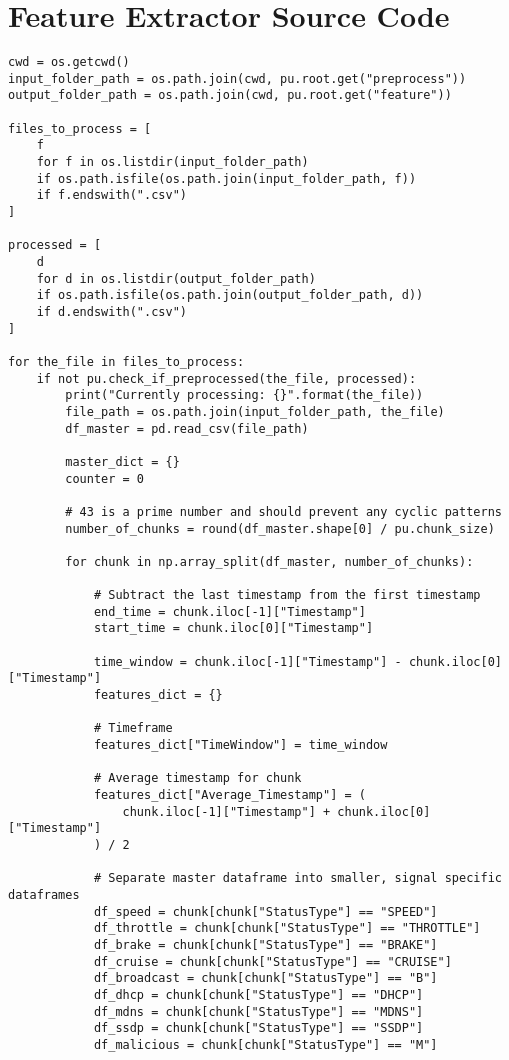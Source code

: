 \section{Feature Extractor Source Code}
\begin{verbatim}
cwd = os.getcwd()
input_folder_path = os.path.join(cwd, pu.root.get("preprocess"))
output_folder_path = os.path.join(cwd, pu.root.get("feature"))

files_to_process = [
    f
    for f in os.listdir(input_folder_path)
    if os.path.isfile(os.path.join(input_folder_path, f))
    if f.endswith(".csv")
]

processed = [
    d
    for d in os.listdir(output_folder_path)
    if os.path.isfile(os.path.join(output_folder_path, d))
    if d.endswith(".csv")
]

for the_file in files_to_process:
    if not pu.check_if_preprocessed(the_file, processed):
        print("Currently processing: {}".format(the_file))
        file_path = os.path.join(input_folder_path, the_file)
        df_master = pd.read_csv(file_path)

        master_dict = {}
        counter = 0

        # 43 is a prime number and should prevent any cyclic patterns
        number_of_chunks = round(df_master.shape[0] / pu.chunk_size)

        for chunk in np.array_split(df_master, number_of_chunks):

            # Subtract the last timestamp from the first timestamp
            end_time = chunk.iloc[-1]["Timestamp"]
            start_time = chunk.iloc[0]["Timestamp"]

            time_window = chunk.iloc[-1]["Timestamp"] - chunk.iloc[0]["Timestamp"]
            features_dict = {}

            # Timeframe
            features_dict["TimeWindow"] = time_window

            # Average timestamp for chunk
            features_dict["Average_Timestamp"] = (
                chunk.iloc[-1]["Timestamp"] + chunk.iloc[0]["Timestamp"]
            ) / 2

            # Separate master dataframe into smaller, signal specific dataframes
            df_speed = chunk[chunk["StatusType"] == "SPEED"]
            df_throttle = chunk[chunk["StatusType"] == "THROTTLE"]
            df_brake = chunk[chunk["StatusType"] == "BRAKE"]
            df_cruise = chunk[chunk["StatusType"] == "CRUISE"]
            df_broadcast = chunk[chunk["StatusType"] == "B"]
            df_dhcp = chunk[chunk["StatusType"] == "DHCP"]
            df_mdns = chunk[chunk["StatusType"] == "MDNS"]
            df_ssdp = chunk[chunk["StatusType"] == "SSDP"]
            df_malicious = chunk[chunk["StatusType"] == "M"]


\end{verbatim}
